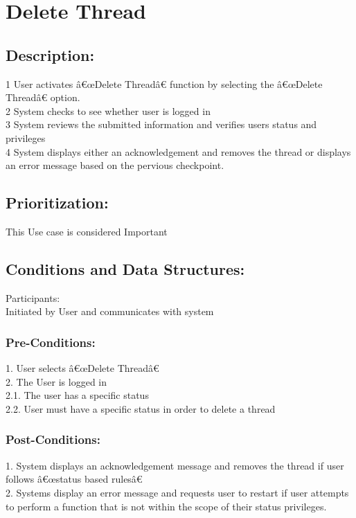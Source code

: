 \documentclass[a4paper,11pt]{article}
\begin{document}
\section{Delete Thread}
\subsection*{Description:}
1	User activates â€œDelete Threadâ€ function by selecting the â€œDelete Threadâ€ option.\\
2	System checks to see whether user is logged in\\
3	System reviews the submitted information and  verifies users status and privileges\\
4	System displays either an acknowledgement and removes the thread or displays an error message based on the pervious checkpoint.\\
\subsection{Prioritization:} 
This Use case is considered Important\\
\subsection{Conditions and Data Structures:}
Participants:\\
Initiated by User and communicates with system\\
\subsubsection*{Pre-Conditions:}
1.	User selects â€œDelete Threadâ€ \\
2.	The User is logged in \\
2.1.	The user has a specific status\\
2.2.	User must have a specific status in order to delete a thread\\
\subsubsection*{Post-Conditions:}
1.	System displays an acknowledgement message and removes  the thread  if user follows â€œstatus based rulesâ€\\
2.	Systems display an error message and requests user to restart if user attempts to perform a function that is not within the scope of their status privileges.\\
\end{document}
